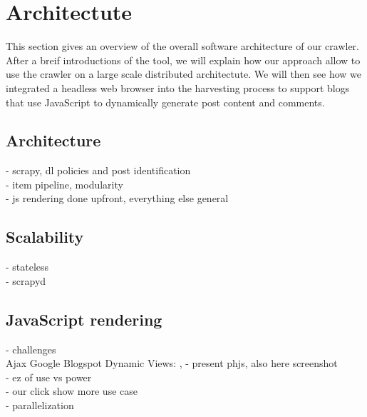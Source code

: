 \section{Architectute}

This section gives an overview of the overall software architecture of our crawler. After a breif introductions of the tool, we will explain how our approach allow to use the crawler on a large scale distributed architectute. We will then see how we integrated a headless web browser into the harvesting process to support blogs that use JavaScript to dynamically generate post content and comments.

\subsection{Architecture}
- scrapy, dl policies and post identification \\
- item pipeline, modularity \\
- js rendering done upfront, everything else general \\

\subsection{Scalability}
- stateless \\
- scrapyd \\

\subsection{JavaScript rendering}
- challenges \\
Ajax
Google Blogspot Dynamic Views: , 
- present phjs, also here screenshot \\
- ez of use vs power \\
- our click show more use case \\
- parallelization \\

